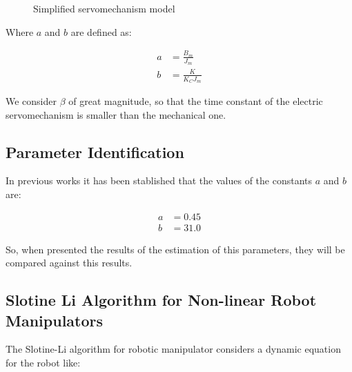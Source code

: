 \documentclass[journal]{IEEEtran}
\begin{document}
        \begin{figure}[!t]
            \begin{center}
            \end{center}
            \caption{Simplified servomechanism model}
            \label{fig_simpleservomodel}
        \end{figure}

        Where $a$ and $b$ are defined as:

        \begin{align}
            a &= \frac{B_m}{J_m} \\
            b &= \frac{K}{K_C J_m}
        \end{align}

        We consider $\beta$ of great magnitude, so that the time constant of the electric servomechanism is smaller than the mechanical one.
        
    \subsection{Parameter Identification}

        In previous works it has been stablished that the values of the constants $a$ and $b$ are:

        \begin{align}   
            a &= 0.45 \\
            b &= 31.0
        \end{align}

        So, when presented the results of the estimation of this parameters, they will be compared against this results.

    \subsection{Slotine Li Algorithm for Non-linear Robot Manipulators}

        The Slotine-Li algorithm for robotic manipulator considers a dynamic equation for the robot like:
\end{document}
